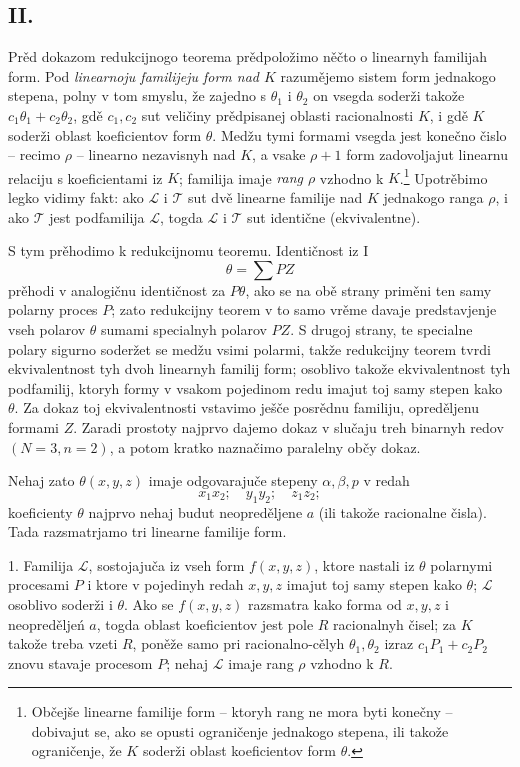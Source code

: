 \documentclass[11pt]{article}
\begin{document}
\subsection*{II.}
Prěd dokazom redukcijnogo teorema prědpoložimo něčto o linearnyh familijah form. Pod {\itshape linearnoju familijeju form nad $K$} razumějemo sistem form jednakogo stepena, polny v tom smyslu, že zajedno s $\theta_1$ i $\theta_2$ on vsegda soderži takože $c_1\theta_1+c_2\theta_2$, gdě $c_1,c_2$ sut veličiny prědpisanej oblasti racionalnosti $K$, i gdě $K$ soderži oblast koeficientov form $\theta$. Medžu tymi formami vsegda jest konečno čislo -- recimo $\rho$ -- linearno nezavisnyh nad $K$, a vsake $\rho+1$ form zadovoljajut linearnu relaciju s koeficientami iz $K$; familija imaje {\itshape rang $\rho$} vzhodno k $K$.\footnote{Občejše linearne familije form -- ktoryh rang ne mora byti konečny -- dobivajut se, ako se opusti ograničenje jednakogo stepena, ili takože ograničenje, že $K$ soderži oblast koeficientov form $\theta$.} Upotrěbimo legko vidimy fakt: ako $\mathcal L$ i $\mathcal T$ sut dvě linearne familije nad $K$ jednakogo ranga $\rho$, i ako $\mathcal T$ jest podfamilija $\mathcal L$, togda $\mathcal L$ i $\mathcal T$ sut identične (ekvivalentne).

S tym prěhodimo k redukcijnomu teoremu. Identičnost iz I
\[
  \theta=\sum PZ
\]
prěhodi v analogičnu identičnost za $P\theta$, ako se na obě strany priměni ten samy polarny proces $P$; zato redukcijny teorem v to samo vrěme davaje predstavjenje vseh polarov $\theta$ sumami specialnyh polarov $PZ$. S drugoj strany, te specialne polary sigurno soderžet se medžu vsimi polarmi, takže redukcijny teorem tvrdi ekvivalentnost tyh dvoh linearnyh familij form; osoblivo takože ekvivalentnost tyh podfamilij, ktoryh formy v vsakom pojedinom redu imajut toj samy stepen kako $\theta$. Za dokaz toj ekvivalentnosti vstavimo ješče posrědnu familiju, opreděljenu formami $Z$. Zaradi prostoty najprvo dajemo dokaz v slučaju treh binarnyh redov $(N=3,n=2)$, a potom kratko naznačimo paralelny občy dokaz.

Nehaj zato $\theta(x,y,z)$ imaje odgovarajuče stepeny $\alpha,\beta,p$ v redah
\[
  x_1x_2;\quad y_1y_2;\quad z_1z_2;
\]
koeficienty $\theta$ najprvo nehaj budut neopreděljene $a$ (ili takože racionalne čisla). Tada razsmatrjamo tri linearne familije form.

1. Familija $\mathcal L$, sostojajuča iz vseh form $f(x,y,z)$, ktore nastali iz $\theta$ polarnymi procesami $P$ i ktore v pojedinyh redah $x,y,z$ imajut toj samy stepen kako $\theta$; $\mathcal L$ osoblivo soderži i $\theta$. Ako se $f(x,y,z)$ razsmatra kako forma od $x,y,z$ i neopreděljeń $a$, togda oblast koeficientov jest pole $R$ racionalnyh čisel; za $K$ takože treba vzeti $R$, poněže samo pri racionalno-cělyh $\theta_1,\theta_2$ izraz $c_1P_1+c_2P_2$ znovu stavaje procesom $P$; nehaj $\mathcal L$ imaje rang $\rho$ vzhodno k $R$.
\end{document}
